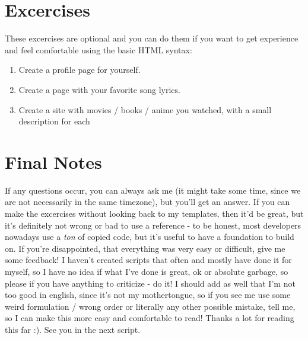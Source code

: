 \documentclass[a4paper,12pt]{article}
\begin{document}
\section{Excercises}
These excercises are optional and you can do them if you want to get experience and feel comfortable using the basic HTML syntax:
\begin{enumerate}
    \item Create a profile page for yourself.
    \item Create a page with your favorite song lyrics.
    \item Create a site with movies / books / anime you watched, with a small description for each
\end{enumerate}

\section{Final Notes}
If any questions occur, you can always ask me (it might take some time, since we are not necessarily in the same timezone), but you'll get an answer. If you can make the excercises without looking back to my templates, then it'd be great, but it's definitely not wrong or bad to use a reference - to be honest, most developers nowadays use a \textit{ton} of copied code, but it's useful to have a foundation to build on. If you're disappointed, that everything was very easy or difficult, give me some feedback! I haven't created scripts that often and mostly have done it for myself, so I have no idea if what I've done is great, ok or absolute garbage, so please if you have anything to criticize - do it! I should add as well that I'm not too good in english, since it's not my mothertongue, so if you see me use some weird formulation / wrong order or literally any other possible mistake, tell me, so I can make this more easy and comfortable to read! Thanks a lot for reading this far :). See you in the next script.
\end{document}
